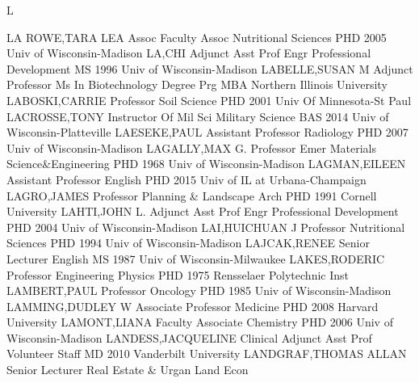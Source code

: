 \documentclass[
]{article}
\begin{document}
L

\textbar{}

LA ROWE,TARA LEA \textbar Assoc Faculty Assoc \textbar Nutritional
Sciences \textbar{}  \textbar PHD 2005 Univ of
Wisconsin-Madison \textbar LA,CHI \textbar Adjunct Asst Prof
\textbar Engr Professional Development \textbar{} 
\textbar MS 1996 Univ of Wisconsin-Madison \textbar LABELLE,SUSAN M
\textbar Adjunct Professor \textbar Ms In Biotechnology Degree Prg
\textbar{}  \textbar MBA Northern Illinois University
\textbar LABOSKI,CARRIE \textbar Professor \textbar Soil Science
\textbar{}  \textbar PHD 2001 Univ Of Minnesota-St Paul
\textbar LACROSSE,TONY \textbar Instructor Of Mil Sci \textbar Military
Science \textbar{}  \textbar BAS 2014 Univ of
Wisconsin-Platteville \textbar LAESEKE,PAUL \textbar Assistant Professor
\textbar Radiology \textbar{}  \textbar PHD 2007 Univ of
Wisconsin-Madison \textbar LAGALLY,MAX G. \textbar Professor Emer
\textbar Materials Science\&Engineering \textbar{} 
\textbar PHD 1968 Univ of Wisconsin-Madison \textbar LAGMAN,EILEEN
\textbar Assistant Professor \textbar English \textbar{} 
\textbar PHD 2015 Univ of IL at Urbana-Champaign \textbar LAGRO,JAMES
\textbar Professor \textbar Planning \& Landscape Arch \textbar{}
 \textbar PHD 1991 Cornell University \textbar LAHTI,JOHN L.
\textbar Adjunct Asst Prof \textbar Engr Professional Development
\textbar{}  \textbar PHD 2004 Univ of Wisconsin-Madison
\textbar LAI,HUICHUAN J \textbar Professor \textbar Nutritional Sciences
\textbar{}  \textbar PHD 1994 Univ of Wisconsin-Madison
\textbar LAJCAK,RENEE \textbar Senior Lecturer \textbar English
\textbar{}  \textbar MS 1987 Univ of Wisconsin-Milwaukee
\textbar LAKES,RODERIC \textbar Professor \textbar Engineering Physics
\textbar{}  \textbar PHD 1975 Rensselaer Polytechnic Inst
\textbar LAMBERT,PAUL \textbar Professor \textbar Oncology \textbar{}
 \textbar PHD 1985 Univ of Wisconsin-Madison
\textbar LAMMING,DUDLEY W \textbar Associate Professor \textbar Medicine
\textbar{}  \textbar PHD 2008 Harvard University
\textbar LAMONT,LIANA \textbar Faculty Associate \textbar Chemistry
\textbar{}  \textbar PHD 2006 Univ of Wisconsin-Madison
\textbar LANDESS,JACQUELINE \textbar Clinical Adjunct Asst Prof
\textbar Volunteer Staff \textbar{}  \textbar MD 2010
Vanderbilt University \textbar LANDGRAF,THOMAS ALLAN \textbar Senior
Lecturer \textbar Real Estate \& Urgan Land Econ \textbar{} 
\end{document}
